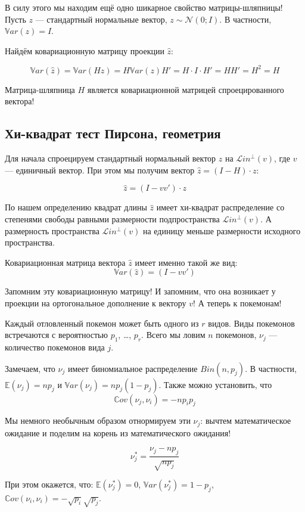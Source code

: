 \documentclass[11pt,russian,]{article}
\newcommand{\cN}{\mathcal{N}}
\newcommand{\E}{\mathbb{E}}
\newcommand{\1}{\mathbbm{1}}
\newcommand{\Lin}{\mathcal{L}in}
\newcommand{\Linp}{\Lin^{\perp}}
\newcommand{\Var}{\mathbb{V}ar}
\newcommand{\Cov}{\mathbb{C}ov}
\begin{document}
В силу этого мы находим ещё одно шикарное свойство матрицы-шляпницы!
Пусть \(z\) --- стандартный нормальные вектор, \(z \sim \cN(0; I)\). В
частности, \(\Var(z) = I\).

Найдём ковариационную матрицу проекции \(\hat z\):

\[
\Var(\hat z) = \Var(Hz)=H\Var(z)H'=H\cdot I\cdot H'=HH'=H^2=H
\]

Матрица-шляпница \(H\) является ковариационной матрицей спроецированного
вектора!

\subsection{Хи-квадрат тест Пирсона, геометрия}\label{----}

Для начала спроецируем стандартный нормальный вектор \(z\) на
\(\Linp(v)\), где \(v\) --- единичный вектор. При этом мы получим вектор
\(\hat z = (I - H) \cdot z\):

\[
\hat z = (I - vv')\cdot z
\]

По нашем определению квадрат длины \(\hat z\) имеет хи-квадрат
распределение со степенями свободы равными размерности подпространства
\(\Linp(v)\). А размерность пространства \(\Linp(v)\) на единицу меньше
размерности исходного пространства.

Ковариационная матрица вектора \(\hat z\) имеет именно такой же вид: \[
\Var(\hat z) = (I - vv')
\]

Запомним эту ковариационную матрицу! И запомним, что она возникает у
проекции на ортогональное дополнение к вектору \(v\)! А теперь к
покемонам!

Каждый отловленный покемон может быть одного из \(r\) видов. Виды
покемонов встречаются с вероятностью \(p_1\), \ldots, \(p_{r}\). Всего
мы ловим \(n\) покемонов, \(\nu_j\) --- количество покемонов вида \(j\).

Замечаем, что \(\nu_j\) имеет биномиальное распределение
\(Bin(n, p_j)\). В частности, \(\E(\nu_j) = np_j\) и
\(\Var(\nu_j)=n p_j (1- p_j)\). Также можно установить, что \[
\Cov(\nu_j, \nu_i) = -np_ip_j
\]

Мы немного необычным образом отнормируем эти \(\nu_j\): вычтем
математическое ожидание и поделим на корень из математического ожидания!

\[
\nu_j^* = \frac{\nu_j - np_j}{\sqrt{np_j}}
\]

При этом окажется, что: \(\E(\nu_j^*) = 0\),
\(\Var(\nu_j^*) = 1 - p_j\),
\(\Cov(\nu_i, \nu_i) = - \sqrt{p_i}\sqrt{p_j}\).
\end{document}

